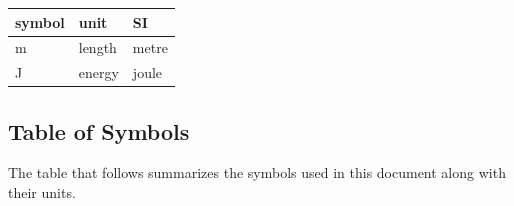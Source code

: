 \documentclass[12pt]{article}
\begin{document}
\renewcommand{\arraystretch}{1.2}
  \noindent \begin{tabular}{l l l} 
    \toprule		
    \textbf{symbol} & \textbf{unit} & \textbf{SI}\\
    \midrule 
    \si{\metre} & length & metre\\
    \si{\joule} & energy & joule\\
    \bottomrule
  \end{tabular}




\subsection{Table of Symbols}

The table that follows summarizes the symbols used in this document along with
their units. 
\end{document}
